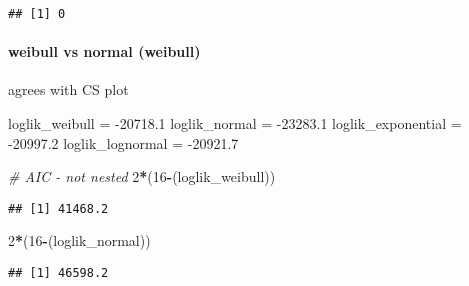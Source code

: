 \documentclass[]{article}
\newenvironment{Shaded}{\begin{snugshade}}{\end{snugshade}}
\newcommand{\CommentTok}[1]{\textcolor[rgb]{0.56,0.35,0.01}{\textit{#1}}}
\newcommand{\DecValTok}[1]{\textcolor[rgb]{0.00,0.00,0.81}{#1}}
\newcommand{\FloatTok}[1]{\textcolor[rgb]{0.00,0.00,0.81}{#1}}
\newcommand{\KeywordTok}[1]{\textcolor[rgb]{0.13,0.29,0.53}{\textbf{#1}}}
\newcommand{\NormalTok}[1]{#1}
\newcommand{\OperatorTok}[1]{\textcolor[rgb]{0.81,0.36,0.00}{\textbf{#1}}}
\newcommand{\StringTok}[1]{\textcolor[rgb]{0.31,0.60,0.02}{#1}}
\let\oldparagraph\paragraph
\renewcommand{\paragraph}[1]{\oldparagraph{#1}\mbox{}}
\begin{document}
\begin{Shaded}
\end{Shaded}

\begin{verbatim}
## [1] 0
\end{verbatim}

\hypertarget{weibull-vs-normal-weibull}{%
\paragraph{weibull vs normal
(weibull)}\label{weibull-vs-normal-weibull}}

agrees with CS plot

\begin{Shaded}
\begin{Highlighting}[]
\NormalTok{loglik_weibull =}\StringTok{ }\FloatTok{-20718.1}
\NormalTok{loglik_normal =}\StringTok{ }\FloatTok{-23283.1}
\NormalTok{loglik_exponential =}\StringTok{ }\FloatTok{-20997.2}
\NormalTok{loglik_lognormal =}\StringTok{ }\FloatTok{-20921.7} 

\CommentTok{# AIC - not nested }
\DecValTok{2}\OperatorTok{*}\NormalTok{(}\DecValTok{16}\OperatorTok{-}\NormalTok{(loglik_weibull))}
\end{Highlighting}
\end{Shaded}

\begin{verbatim}
## [1] 41468.2
\end{verbatim}

\begin{Shaded}
\begin{Highlighting}[]
\DecValTok{2}\OperatorTok{*}\NormalTok{(}\DecValTok{16}\OperatorTok{-}\NormalTok{(loglik_normal))}
\end{Highlighting}
\end{Shaded}

\begin{verbatim}
## [1] 46598.2
\end{verbatim}
\end{document}
